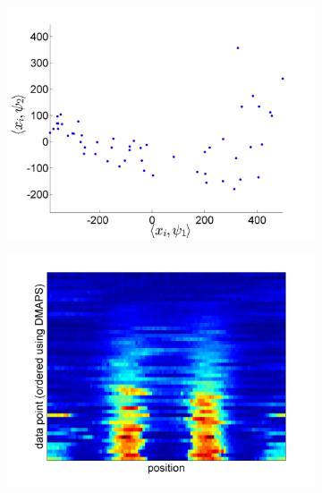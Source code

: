 \documentclass[10pt]{article}
\begin{document}
\begin{figure}[!ht]
\begin{subfigure}{0.3\textwidth}
\includegraphics[width=\textwidth]{coeff_12_new}
\caption{}
\label{subfig:PCA_12}
\end{subfigure}
\begin{subfigure}{0.3\textwidth}
\includegraphics[width=\textwidth]{data_ordered_DMAPS}
\caption{}
\end{subfigure}
\begin{subfigure}{0.3\textwidth}

\end{subfigure}
\end{figure}
\end{document}
